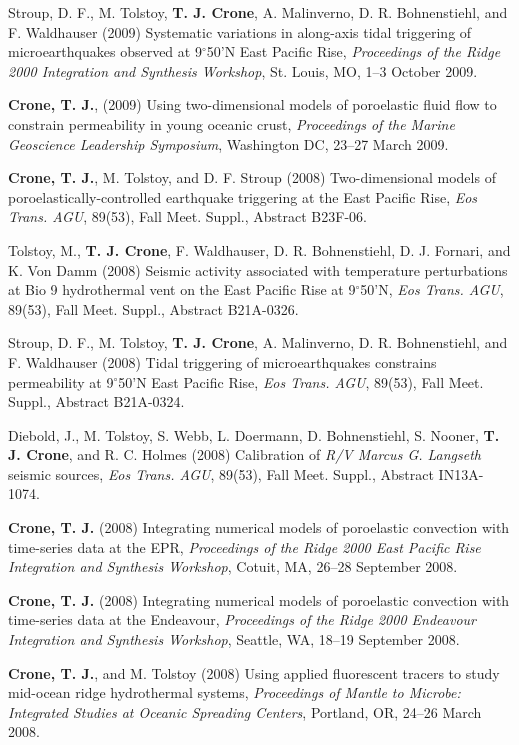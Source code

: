 \documentclass[11pt]{res}
\begin{document}
\begin{resume}
Stroup, D. F., M. Tolstoy, {\bf T. J. Crone}, A. Malinverno, D. R.  Bohnenstiehl, and F. Waldhauser (2009) Systematic variations in along-axis tidal triggering of microearthquakes observed at 9$^\circ$50'N East Pacific Rise, {\em Proceedings of the Ridge 2000 Integration and Synthesis Workshop}, St. Louis, MO, 1--3 October 2009.

{\bf Crone, T. J.}, (2009) Using two-dimensional models of poroelastic fluid flow to constrain permeability in young oceanic crust, {\em Proceedings of the Marine Geoscience Leadership Symposium}, Washington DC, 23--27 March 2009.

{\bf Crone, T. J.}, M. Tolstoy, and D. F. Stroup (2008) Two-dimensional models of poroelastically-controlled earthquake triggering at the East Pacific Rise, {\em Eos Trans. AGU}, 89(53), Fall Meet. Suppl., Abstract B23F-06.

Tolstoy, M., {\bf T. J. Crone}, F. Waldhauser, D. R. Bohnenstiehl, D. J.  Fornari, and K. Von Damm (2008) Seismic activity associated with temperature perturbations at Bio 9 hydrothermal vent on the East Pacific Rise at 9$^\circ$50'N, {\em Eos Trans. AGU}, 89(53), Fall Meet. Suppl., Abstract B21A-0326.

Stroup, D. F., M. Tolstoy, {\bf T. J. Crone}, A. Malinverno, D. R.  Bohnenstiehl, and F.  Waldhauser (2008) Tidal triggering of microearthquakes constrains permeability at 9$^\circ$50'N East Pacific Rise, {\em Eos Trans.  AGU}, 89(53), Fall Meet. Suppl., Abstract B21A-0324.

Diebold, J., M. Tolstoy, S. Webb, L. Doermann, D. Bohnenstiehl, S. Nooner, {\bf T. J. Crone}, and R. C. Holmes (2008) Calibration of {\em R/V Marcus G.  Langseth} seismic sources, {\em Eos Trans. AGU}, 89(53), Fall Meet. Suppl., Abstract IN13A-1074.

{\bf Crone, T. J.} (2008) Integrating numerical models of poroelastic convection with time-series data at the EPR, {\em Proceedings of the Ridge 2000 East Pacific Rise Integration and Synthesis Workshop}, Cotuit, MA, 26--28 September 2008.

{\bf Crone, T. J.} (2008) Integrating numerical models of poroelastic convection with time-series data at the Endeavour, {\em Proceedings of the Ridge 2000 Endeavour Integration and Synthesis Workshop}, Seattle, WA, 18--19 September 2008.

{\bf Crone, T. J.}, and M. Tolstoy (2008) Using applied fluorescent tracers to study mid-ocean ridge hydrothermal systems, {\em Proceedings of Mantle to Microbe: Integrated Studies at Oceanic Spreading Centers}, Portland, OR, 24--26 March 2008.


\end{resume}
\end{document}
